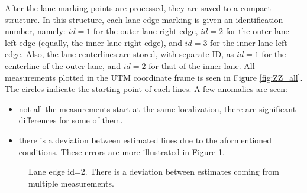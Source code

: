 \documentclass[sn-mathphys-num]{sn-jnl}%
\begin{document}
\newline
After the lane marking points are processed, they are saved to a compact structure. In this structure, each lane edge marking is given an identification number, 
namely: $id=1$ for the outer lane right edge, $id=2$ for the outer lane left edge (equally, the inner lane right edge), and $id=3$ for the inner lane left 
edge. Also, the lane centerlines are stored, with separate ID, as $id=1$ for the centerline of the outer lane, and $id=2$ for that of the inner lane. 
All measurements plotted in the UTM coordinate frame is seen in Figure \ref{fig:ZZ_all}. The circles indicate the starting point of each lines. A few anomalies
are seen:
\begin{itemize}
    \item not all the measurements start at the same localization, there are significant differences for some of them.
    \item there is a deviation between estimated lines due to the aformentioned conditions. These errors are more illustrated in Figure \ref{fig:ZZ_straight_close}.
\end{itemize}
\begin{figure}[h]
    \caption{Lane edge id=2. There is a deviation between estimates coming from multiple measurements.}
    \label{fig:ZZ_straight_close}
\end{figure}
\end{document}
